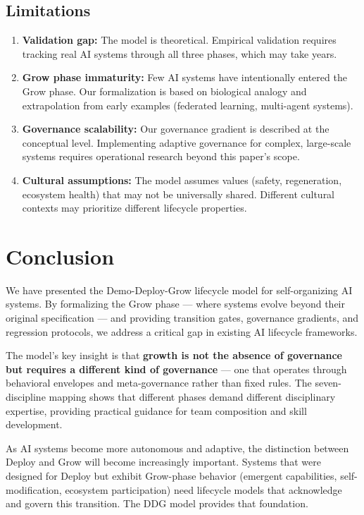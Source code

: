 \documentclass[11pt,a4paper]{article}
\begin{document}
\subsection{Limitations}

\begin{enumerate}[nosep]
    \item \textbf{Validation gap:} The model is theoretical. Empirical validation requires tracking real AI systems through all three phases, which may take years.
    \item \textbf{Grow phase immaturity:} Few AI systems have intentionally entered the Grow phase. Our formalization is based on biological analogy and extrapolation from early examples (federated learning, multi-agent systems).
    \item \textbf{Governance scalability:} Our governance gradient is described at the conceptual level. Implementing adaptive governance for complex, large-scale systems requires operational research beyond this paper's scope.
    \item \textbf{Cultural assumptions:} The model assumes values (safety, regeneration, ecosystem health) that may not be universally shared. Different cultural contexts may prioritize different lifecycle properties.
\end{enumerate}

\section{Conclusion}

We have presented the Demo-Deploy-Grow lifecycle model for self-organizing AI systems. By formalizing the Grow phase --- where systems evolve beyond their original specification --- and providing transition gates, governance gradients, and regression protocols, we address a critical gap in existing AI lifecycle frameworks.

The model's key insight is that \textbf{growth is not the absence of governance but requires a different kind of governance} --- one that operates through behavioral envelopes and meta-governance rather than fixed rules. The seven-discipline mapping shows that different phases demand different disciplinary expertise, providing practical guidance for team composition and skill development.

As AI systems become more autonomous and adaptive, the distinction between Deploy and Grow will become increasingly important. Systems that were designed for Deploy but exhibit Grow-phase behavior (emergent capabilities, self-modification, ecosystem participation) need lifecycle models that acknowledge and govern this transition. The DDG model provides that foundation.
\end{document}
